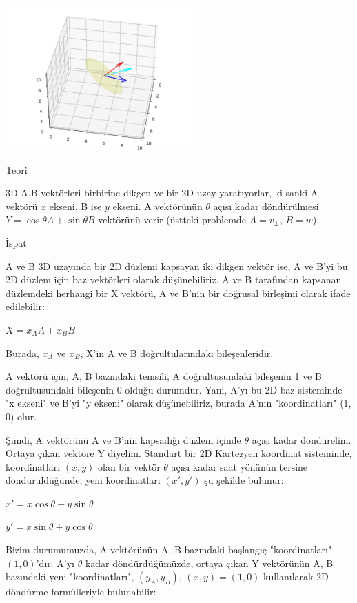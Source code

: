 \documentclass[12pt,fleqn]{article}\usepackage{../../common}
\begin{document}
\includegraphics[width=20em]{phy_073_rot_02.jpg}

Teori

3D A,B vektörleri birbirine dikgen ve bir 2D uzay yaratıyorlar, ki sanki A
vektörü $x$ ekseni, B ise $y$ ekseni. A vektörünün $\theta$ açısı kadar
döndürülmesi $Y = \cos \theta A + \sin \theta B$ vektörünü verir (üstteki
problemde $A = v_\perp$, $B = w$).

İspat

A ve B 3D uzayında bir 2D düzlemi kapsayan iki dikgen vektör ise, A ve B'yi bu
2D düzlem için baz vektörleri olarak düşünebiliriz. A ve B tarafından kapsanan
düzlemdeki herhangi bir X vektörü, A ve B'nin bir doğrusal birleşimi olarak
ifade edilebilir:

$X = x_A A + x_B B$

Burada, $x_A$ ve $x_B$, X'in A ve B doğrultularındaki bileşenleridir.

A vektörü için, {A, B} bazındaki temsili, A doğrultusundaki bileşenin
1 ve B doğrultusundaki bileşenin 0 olduğu durumdur. Yani, A'yı bu 2D
baz sisteminde "x ekseni" ve B'yi "y ekseni" olarak düşünebiliriz,
burada A'nın "koordinatları" (1, 0) olur.

Şimdi, A vektörünü A ve B'nin kapsadığı düzlem içinde $\theta$ açısı
kadar döndürelim. Ortaya çıkan vektöre Y diyelim. Standart bir 2D
Kartezyen koordinat sisteminde, koordinatları $(x, y)$ olan bir vektör
$\theta$ açısı kadar saat yönünün tersine döndürüldüğünde, yeni
koordinatları $(x', y')$ şu şekilde bulunur:

$x' = x \cos \theta - y \sin \theta$

$y' = x \sin \theta + y \cos \theta$

Bizim durumumuzda, A vektörünün {A, B} bazındaki başlangıç
"koordinatları" $(1, 0)$'dır. A'yı $\theta$ kadar döndürdüğümüzde,
ortaya çıkan Y vektörünün {A, B} bazındaki yeni "koordinatları",
$(y_A, y_B)$, $(x, y) = (1, 0)$ kullanılarak 2D döndürme formülleriyle
bulunabilir:
\end{document}
